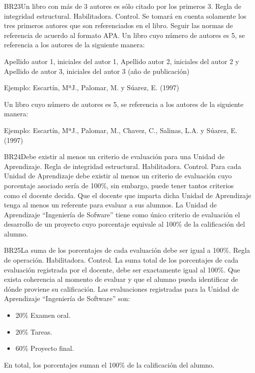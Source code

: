 \begin{BussinesRule}{BR23}{Un libro con más de 3 autores es sólo citado por los primeros 3.}
    \BRitem[Tipo:] Regla de integridad estructural.
    \BRitem[Clase:] Habilitadora.
    \BRitem[Nivel:] Control.
    \BRitem[Descripción:] Se tomará en cuenta solamente los tres primeros autores que son referenciados en el libro.
    \BRitem[Motivación:] Seguir las normas de referencia de acuerdo al formato APA.
     Un libro cuyo número de autores es 5, se referencia a los autores de la siguiente manera:

    Apellido autor 1, iniciales del autor 1, Apellido autor 2, iniciales del autor 2 y Apellido de autor 3, iniciales del autor 3 (año de publicación)

    Ejemplo: Escartín, MªJ., Palomar, M. y Súarez, E. (1997)

     Un libro cuyo número de autores es 5, se referencia a los autores de la siguiente manera:

    Ejemplo: Escartín, MªJ., Palomar, M., Chavez, C., Salinas, L.A. y Súarez, E. (1997)
\end{BussinesRule}

\begin{BussinesRule}{BR24}{Debe existir al menos un criterio de evaluación para una Unidad de Aprendizaje.}
    \BRitem[Tipo:] Regla de integridad estructural.
    \BRitem[Clase:] Habilitadora.
    \BRitem[Nivel:] Control.
    \BRitem[Descripción:] Para cada Unidad de Aprendizaje debe existir al menos un criterio de evaluación cuyo porcentaje asociado sería de 100\%, sin embargo, puede tener tantos criterios como el docente decida.
    \BRitem[Motivación:] Que el docente que imparta dicha Unidad de Aprendizaje tenga al menos un referente para evaluar a sus alumnos.
     La Unidad de Aprendizaje ``Ingeniería de Sofware'' tiene como único criterio de evaluación el desarrollo de un proyecto cuyo porcentaje equivale al 100\% de la calificación del alumno.
\end{BussinesRule}

\begin{BussinesRule}{BR25}{La suma de los porcentajes de cada evaluación debe ser igual a 100\%.}
    \BRitem[Tipo:] Regla de operación.
    \BRitem[Clase:] Habilitadora.
    \BRitem[Nivel:] Control.
    \BRitem[Descripción:] La suma total de los porcentajes de cada evaluación registrada por el docente, debe ser exactamente igual al 100\%.
    \BRitem[Motivación:] Que exista coherencia al momento de evaluar y que el alumno pueda identificar de dónde proviene su calificación.
     Las evaluaciones registradas para la Unidad de Aprendizaje ``Ingeniería de Software'' son:
        \begin{itemize}
            \item 20\% Examen oral.
            \item 20\% Tareas.
            \item 60\% Proyecto final.
        \end{itemize}
        En total, los porcentajes suman el 100\% de la calificación del alumno.
\end{BussinesRule}


